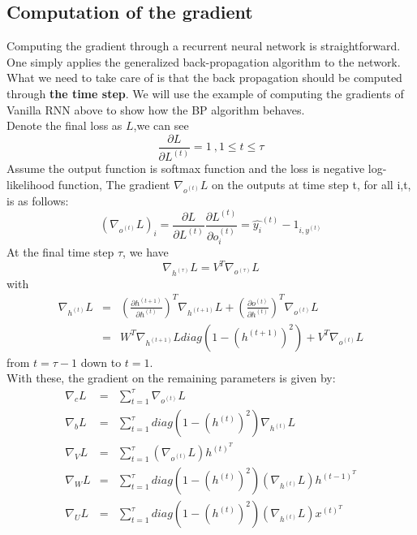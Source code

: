 \subsection{Computation of the gradient}
Computing the gradient through a recurrent neural network is straightforward. One simply applies the generalized back-propagation algorithm to the network. \\
What we need to take care of is that the back propagation should be computed through \textbf{the time step}. We will use the example of computing the gradients of Vanilla RNN above to show how the BP algorithm behaves. \\
Denote the final loss as $L$,we can see 
\begin{equation}
\frac{\partial L}{\partial L^{(t)}} = 1  \ ,1\le t \le \tau
\end{equation}
Assume the output function is softmax function and the loss is negative log-likelihood function, The gradient $\nabla_{o^{(t)}}L$ on the outputs at time step t, for all i,t, is as follows:
\begin{equation}
(\nabla_{o^{(t)}}L)_i = \frac{\partial L}{\partial L^{(t)}}\frac{\partial L^{(t)}}{\partial o_i^{(t)}} = \hat{y_i}^{(t)} - 1_{i,y^{(t)}}
\end{equation}
At the final time step $\tau$, we have
\begin{equation}
\nabla_{h^{(\tau)}}L = V^{T}\nabla_{o^{(\tau)}}L
\end{equation}
with 
\begin{eqnarray}
\nabla_{h^{(t)}}L & = & (\frac{\partial h^{(t+1)}}{\partial h^{(t)}})^{T}\nabla_{h^{(t+1)}}L + (\frac{\partial o^{(t)}}{\partial h^{(t)}})^{T}\nabla_{o^{(t)}}L \\
 & = & W^T\nabla_{h^{(t+1)}}L diag(1 - (h^{(t+1)})^2) + V^T\nabla_{o^{(t)}}L
\end{eqnarray}
from $t = \tau -1$ down to $t = 1$. \\
With these, the gradient on the remaining parameters is given by:
\begin{eqnarray}
\nabla_{c}L & = & \sum_{t=1}^{\tau} \nabla_{o^{(t)}}L \\
\nabla_{b}L & = & \sum_{t=1}^{\tau} diag(1 - (h^{(t)})^2)\nabla_{h^{(t)}}L \\
\nabla_{V}L & = & \sum_{t=1}^{\tau}(\nabla_{o^{(t)}}L)h^{(t)^T} \\
\nabla_{W}L & = & \sum_{t=1}^{\tau} diag(1 - (h^{(t)})^2)(\nabla_{h^{(t)}}L)h^{(t-1)^T} \\
\nabla_{U}L & = & \sum_{t=1}^{\tau} diag(1 - (h^{(t)})^2)(\nabla_{h^{(t)}}L)x^{(t)^T}
\end{eqnarray}
